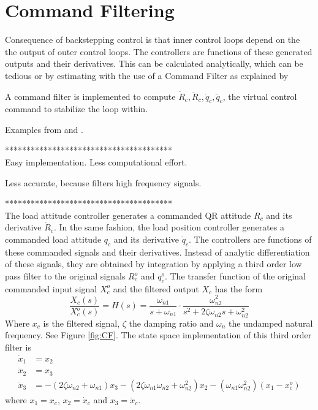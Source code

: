 \section{Command Filtering}
Consequence of backstepping control is that inner control loops depend on the the output of outer control loops. The controllers are functions of these generated outputs and their derivatives. This can be calculated analytically, which can be tedious or by estimating with the use of a Command Filter as explained by \cite{Djapic} 

A command filter is implemented to compute $ \dot{R}_c, \ddot{R}_c,\dot{q}_c, \ddot{q}_c $, the virtual control command to stabilize the loop within. \cite{Farrell2009}

Examples from \cite{Farrell2008} and \cite{Djapic2008}. 

***************************************\\
Easy implementation. Less computational effort.

Less accurate, because filters high frequency signals.

***************************************\\

The load attitude controller generates a commanded QR attitude $ R_c $ and its derivative $ \dot{R}_c $. In the same fashion, the load position controller generates a commanded load attitude $ q_c $ and its derivative $ \dot{q}_c $. The controllers are functions of these commanded signals and their derivatives. Instead of analytic differentiation of these signals, they are obtained by integration by applying a third order low pass filter to the original signals $ R_c^o $ and $ q_c^o $. The transfer function of the original commanded input signal $ X_c^o $ and the filtered output $ X_c $ has the form
\begin{equation}\label{key}
\frac{X_c(s)}{X_c^o(s)}=H(s)=\frac{\omega_{n1}}{s+\omega_{n1}}\cdot\frac{\omega_{n2}^2}{s^2+2\zeta\omega_{n2}s+\omega_{n2}^2}
\end{equation}
Where $ x_c $ is the filtered signal, $ \zeta $ the damping ratio and $ \omega_n $ the undamped natural frequency. See Figure \ref{fig:CF}.
The state space implementation of this third order filter is \cite{Djapic2008}
\begin{align}\label{key}
\dot{x}_1 &= x_2\\ %
\dot{x}_2 &= x_3\\ %
\dot{x}_3 &= -(2\zeta \omega_{n2}+\omega_{n1})x_3-(2\zeta\omega_{n1}\omega_{n2}+\omega_{n2}^2)x_2-(\omega_{n1}\omega_{n2}^2)(x_1-x_c^o)
\end{align}
where $ x_1 = x_c$, $ x_2 = \dot{x}_c$ and $ x_3 = \ddot{x}_c$. 

